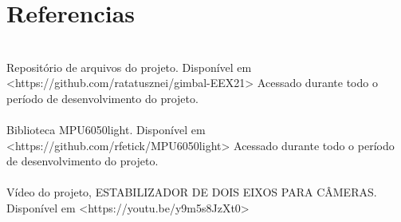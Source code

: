 \chapter{Referencias}

\phantom{aaa}\\
Repositório de arquivos do projeto. Disponível em <https://github.com/ratatusznei/gimbal-EEX21> Acessado durante todo o período de desenvolvimento do projeto.\\\\
Biblioteca MPU6050\textunderscore light. Disponível em <https://github.com/rfetick/MPU6050\textunderscore light> Acessado durante todo o período de desenvolvimento do projeto.\\\\
Vídeo do projeto, ESTABILIZADOR DE DOIS EIXOS PARA CÂMERAS. Disponível em <https://youtu.be/y9m5s8JzXt0>